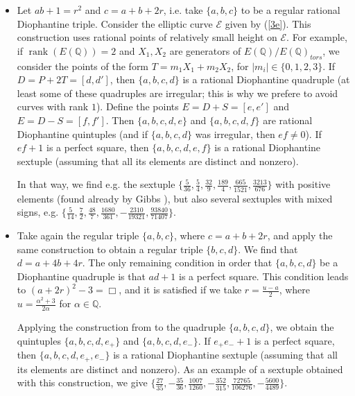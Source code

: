 \documentclass [11pt] {article}
\def\rank {\mathop{\mathrm{rank}}\nolimits}
\begin{document}
\begin{itemize}

\item Let $ab+1=r^2$ and $c=a+b+2r$, i.e. take $\{a,b,c\}$ to be a regular rational
Diophantine triple. Consider the elliptic curve $\mathcal{E}$ given by (\ref{3e}).
This construction uses rational points of relatively small height on $\mathcal{E}$.
For example, if $\rank(E(\mathbb{Q}))=2$ and $X_1,X_2$ are generators
of $E(\mathbb{Q})/E(\mathbb{Q})_{tors}$, we consider the points of the form
$T=m_1X_1+m_2X_2$, for $|m_i| \in \{0,1,2,3 \}$.
If $D=P+2T=[d,d']$, then $\{a,b,c,d\}$ is a rational Diophantine quadruple
(at least some of these quadruples are irregular; this is why we prefere to avoid
curves with rank $1$).
Define the points $E=D+S=[e,e']$ and $E=D-S=[f,f']$.
Then $\{a,b,c,d,e\}$ and $\{a,b,c,d,f\}$ are rational Diophantine quintuples
(and if $\{a,b,c,d\}$ was irregular, then $ef\neq 0$).
If $ef+1$ is a perfect square, then $\{a,b,c,d,e,f\}$ is a rational Diophantine sextuple
(assuming that all its elements are distinct and nonzero).

In that way, we find e.g. the sextuple $\{ \frac{5}{36}, \frac{5}{4}, \frac{32}{9},
\frac{189}{4}, \frac{665}{1521}, \frac{3213}{676} \}$ with positive elements
(found already by Gibbs \cite{Gibbs2}), but also several sextuples with mixed signs, e.g.
$ \{ \frac{5}{14}, \frac{7}{2}, \frac{48}{7}, \frac{1680}{361}, -\frac{2310}{19321}, \frac{93840}{71407} \}$.

\item Take again the regular triple $\{a,b,c\}$, where $c=a+b+2r$, and apply
the same construction to obtain a regular triple $\{b,c,d\}$. We find that $d=a+4b+4r$.
The only remaining condition in order that $\{a,b,c,d\}$ be a Diophantine quadruple
is that $ad+1$ is a perfect square. This condition leads to $(a+2r)^2-3 = \Box$,
and it is satisfied if we take $r=\frac{u-a}{2}$, where $u=\frac{\alpha^2+3}{2\alpha}$
for $\alpha \in \mathbb{Q}$.

Applying the construction from \cite{D-acta2} to the quadruple $\{a,b,c,d\}$,
we obtain the quintuples $\{a,b,c,d,e_{+}\}$ and $\{a,b,c,d,e_{-}\}$.
If $e_{+}e_{-}+1$ is a perfect square, then $\{a,b,c,d,e_{+},e_{-}\}$ is a rational Diophantine sextuple
(assuming that all its elements are distinct and nonzero). As an example of a sextuple obtained
with this construction, we give $\{ \frac{27}{35}, -\frac{35}{36},
\frac{1007}{1260}, -\frac{352}{315}, \frac{72765}{106276}, -\frac{5600}{4489} \}$.


\end{itemize}
\end{document}
